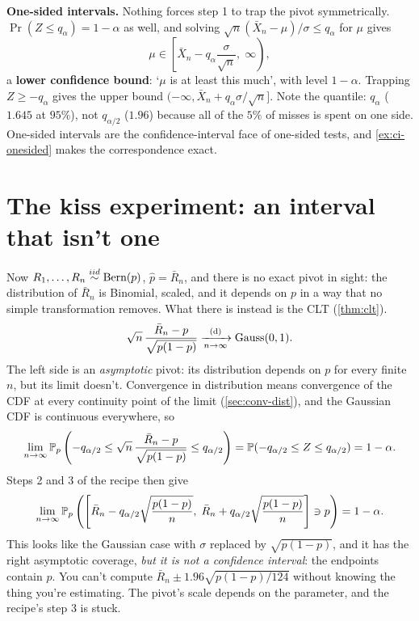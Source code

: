 \textbf{One-sided intervals.}
Nothing forces step 1 to trap the pivot symmetrically.
$\Pr(Z \leq q_\alpha) = 1 - \alpha$ as well, and solving $\sqrt{n}(\bar{X}_n - \mu)/\sigma \leq q_\alpha$ for $\mu$ gives
\[
\mu \in \left[ \bar{X}_n - q_\alpha \frac{\sigma}{\sqrt{n}}, \; \infty \right),
\]
a \textbf{lower confidence bound}: `$\mu$ is at least this much', with level $1 - \alpha$.
Trapping $Z \geq -q_\alpha$ gives the upper bound $(-\infty, \bar{X}_n + q_\alpha \sigma/\sqrt{n}]$.
Note the quantile: $q_\alpha$ ($1.645$ at $95\%$), not $q_{\alpha/2}$ ($1.96$) because all of the $5\%$ of misses is spent on one side.
One-sided intervals are the confidence-interval face of one-sided tests, and \cref{ex:ci-onesided} makes the correspondence exact.

\section{The kiss experiment: an interval that isn't one}
\label{sec:ci-kiss-problem}

Now $R_1, \ldots, R_n \stackrel{iid}{\sim} \text{Bern}(p)$, $\hat{p} = \bar{R}_n$, and there is no exact pivot in sight: the distribution of $\bar{R}_n$ is Binomial, scaled, and it depends on $p$ in a way that no simple transformation removes.
What there is instead is the CLT (\cref{thm:clt}).
\[
\sqrt{n} \, \frac{\bar{R}_n - p}{\sqrt{p(1-p)}} \xrightarrow [n \to \infty ]{\text{(d)}} \text{Gauss}(0, 1).
\]
The left side is an \textit{asymptotic} pivot: its distribution depends on $p$ for every finite $n$, but its limit doesn't.
Convergence in distribution means convergence of the CDF at every continuity point of the limit (\cref{sec:conv-dist}), and the Gaussian CDF is continuous everywhere, so
\[
\lim_{n \to \infty} \mathbb{P}_p \left( -q_{\alpha/2} \leq \sqrt{n} \, \frac{\bar{R}_n - p}{\sqrt{p(1-p)}} \leq q_{\alpha/2} \right) = \mathbb{P}(-q_{\alpha/2} \leq Z \leq q_{\alpha/2}) = 1 - \alpha.
\]
Steps 2 and 3 of the recipe then give
\begin{equation}
\label{eq:ci-not-a-ci}
\lim_{n \to \infty} \mathbb{P}_p \left( \left[ \bar{R}_n - q_{\alpha/2} \sqrt{\frac{p(1-p)}{n}}, \; \bar{R}_n + q_{\alpha/2} \sqrt{\frac{p(1-p)}{n}} \right] \ni p \right) = 1 - \alpha.
\end{equation}
This looks like the Gaussian case with $\sigma$ replaced by $\sqrt{p(1-p)}$, and it has the right asymptotic coverage, \textit{but it is not a confidence interval}: the endpoints contain $p$.
You can't compute $\bar{R}_n \pm 1.96 \sqrt{p(1-p)/124}$ without knowing the thing you're estimating.
The pivot's scale depends on the parameter, and the recipe's step 3 is stuck.


